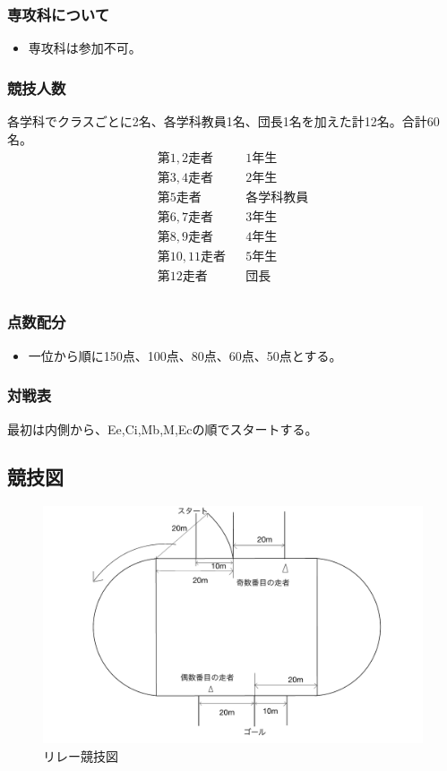 \documentclass[titlepage]{jarticle}
\begin{document}
   \subsubsection{専攻科について}
    \begin{itemize}
     \item 専攻科は参加不可。
    \end{itemize}
   \subsubsection{競技人数}
    各学科でクラスごとに2名、各学科教員1名、団長1名を加えた計12名。合計60名。
    \begin{eqnarray*}
     第1,2走者&&1年生\\
     第3,4走者&&2年生\\
     第5走者&&各学科教員\\
     第6,7走者&&3年生\\
     第8,9走者&&4年生\\
     第10,11走者&&5年生\\
     第12走者&&団長\\
    \end{eqnarray*}
   \subsubsection{点数配分}
    \begin{itemize}
     \item 一位から順に150点、100点、80点、60点、50点とする。
    \end{itemize}
   \subsubsection{対戦表}
    最初は内側から、Ee,Ci,Mb,M,Ecの順でスタートする。
  \subsection{競技図}
   \begin{figure}[H]
    \centering
    \includegraphics[width=12cm]{rire3.pdf}
    \caption{リレー競技図}
   \end{figure}
\end{document}
